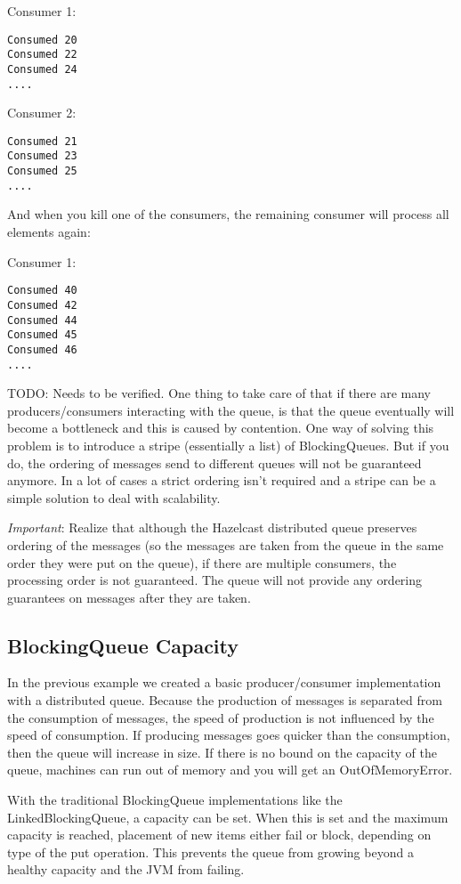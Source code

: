 Consumer 1:
\begin{verbatim}
Consumed 20
Consumed 22
Consumed 24
....
\end{verbatim}

Consumer 2:
\begin{verbatim}
Consumed 21
Consumed 23
Consumed 25
....
\end{verbatim}

And when you kill one of the consumers, the remaining consumer will process all elements again:

Consumer 1:
\begin{verbatim}
Consumed 40  
Consumed 42 
Consumed 44 
Consumed 45
Consumed 46
....
\end{verbatim}

TODO: Needs to be verified.
One thing to take care of that if there are many producers/consumers interacting with the queue, is that the queue eventually will become a bottleneck and this is caused by contention. One way of solving this problem is to introduce a stripe (essentially a list) of BlockingQueues. But if you do, the ordering of messages send to different queues will not be guaranteed anymore. In a lot of cases a strict ordering isn't required and a stripe can be a simple solution to deal with scalability.

\emph{Important}: Realize that although the Hazelcast distributed queue preserves ordering of the messages (so the messages are taken from the queue in the same order they were put on the queue), if there are multiple consumers, the processing order is not guaranteed. The queue will not provide any ordering guarantees on messages after they are taken.

\subsection{BlockingQueue Capacity}

In the previous example we created a basic producer/consumer implementation with a distributed queue. Because the production of messages is separated from the consumption of messages, the speed of production is not influenced by the speed of consumption. If producing messages goes quicker than the consumption, then the queue will increase in size. If there is no bound on the capacity of the queue, machines can run out of memory and you will get an OutOfMemoryError. 

With the traditional BlockingQueue implementations like the LinkedBlockingQueue, a capacity can be set. When this is set and the maximum capacity is reached, placement of new items either fail or block, depending on type of the put operation. This prevents the queue from growing beyond a healthy capacity and the JVM from failing.

